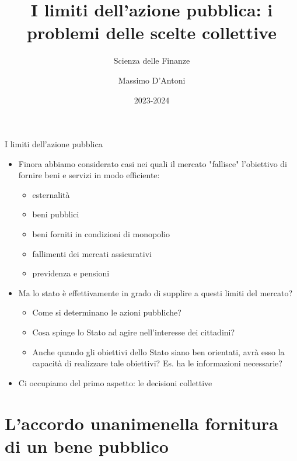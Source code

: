 \documentclass[aspectratio=64,11pt]{beamer}
\institute{Università di Siena}
\author{Massimo D'Antoni}
\date{2023-2024}
\title{I limiti dell'azione pubblica: \newline i problemi delle scelte collettive}
\subtitle{Scienza delle Finanze}
\begin{document}
\maketitle


\begin{frame}{I limiti dell'azione pubblica}
\begin{itemize}
\item Finora abbiamo considerato casi nei quali il mercato "fallisce" l'obiettivo
di fornire beni e servizi in modo efficiente:
\begin{itemize}
\item esternalità
\item beni pubblici
\item beni forniti in condizioni di monopolio
\item fallimenti dei mercati assicurativi
\item previdenza e pensioni
\end{itemize}
\item Ma lo stato è effettivamente in grado di supplire a questi limiti del mercato?
\begin{itemize}
\item Come si determinano le azioni pubbliche?
\item Cosa spinge lo Stato ad agire nell'interesse dei cittadini?
\item Anche quando gli obiettivi dello Stato siano ben orientati, avrà esso la
capacità di realizzare tale obiettivi? Es. ha le informazioni necessarie?
\end{itemize}
\item Ci occupiamo del primo aspetto: le decisioni collettive
\end{itemize}
\end{frame}

\section{L'accordo unanime\newline nella fornitura di un bene pubblico}
\end{document}
